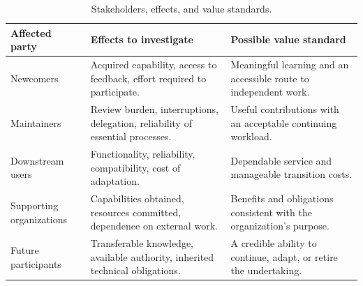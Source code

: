\begin{table}[tbp]
\caption{Stakeholders, effects, and value standards.}
\label{tab:value-questions}
\begingroup\fontsize{9.2}{11.8}\selectfont
\renewcommand{\arraystretch}{1.14}
\begin{tabularx}{\textwidth}{@{}>{\raggedright\arraybackslash}p{26mm}>{\raggedright\arraybackslash}X >{\raggedright\arraybackslash}X@{}}
\toprule
\textbf{Affected party} & \textbf{Effects to investigate} & \textbf{Possible value standard}\\
\midrule
Newcomers & Acquired capability, access to feedback, effort required to participate. & Meaningful learning and an accessible route to independent work.\\[5pt]
Maintainers & Review burden, interruptions, delegation, reliability of essential processes. & Useful contributions with an acceptable continuing workload.\\[5pt]
Downstream users & Functionality, reliability, compatibility, cost of adaptation. & Dependable service and manageable transition costs.\\[5pt]
Supporting organizations & Capabilities obtained, resources committed, dependence on external work. & Benefits and obligations consistent with the organization's purpose.\\[5pt]
Future participants & Transferable knowledge, available authority, inherited technical obligations. & A credible ability to continue, adapt, or retire the undertaking.\\
\bottomrule
\end{tabularx}
\endgroup
{}
\end{table}
